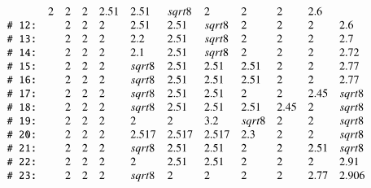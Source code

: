 \begin{tarskidata}
\begin{tarski}
\begin{lemma}
$$\begin{array}{llllllllllll}
   &2 &2 &2 &  2.51& 2.51 &\sqrt8&  2 & 2 & 2 & 2.6\\
%
 \rr{12}&\tuid{MYWEFEM}\tlabel{tarski:E:part4:2}
   &2 &2 &2 &2.51 & 2.51  &\sqrt{8}&   2 & 2 & 2 &  2.6\\
%
 \rr{13}&\tuid{JBUAAWJ} \tlabel{tarski:rem2.7}
     &2 &2 &2 &2.2& 2.51 &\sqrt{8}& 2 & 2 & 2 & 2.7\\
%
 \rr{14}&\tuid{EVWERXQ}\tlabel{tarski:E:part4:3}
   &2 &2 &2 &2.1& 2.51  &\sqrt{8}&   2 & 2 & 2 &  2.72\\
%
 \rr{15}&\tuid{HYEOHXS}\tlabel{tarski:enclosed-v}
   &2 &2 &2 &\sqrt{8}& 2.51 &2.51& 2.51 & 2 & 2 &  2.77\\
%
 \rr{16}&\tuid{MCWJKBZ}\tlabel{tarski:277}
   &2 &2 &2 &\sqrt{8}& 2.51 &2.51& 2.51 & 2 & 2 & 2.77\\
%
 \rr{17}&\tuid{TVORNRR}\tlabel{tarski:245}
   &2 &2 &2 &\sqrt{8}& 2.51 &2.51& 2 & 2 & 2.45 & \sqrt{8}\\
%
 \rr{18}&\tuid{AMVZLGB}\tlabel{tarski:245bis}
   &2 &2 &2 &\sqrt{8}& 2.51 &2.51& 2.51 & 2.45 & 2 & \sqrt{8}\\
%
 \rr{19}&\tuid{UREAOFU}\tlabel{tarski:E:part4:1}
   &2 &2 &2 &  2& 2 &3.2&   \sqrt{8} & 2 & 2 &  \sqrt{8}\\
%
 \rr{20}&\tuid{TADGJXO}\tlabel{tarski:convex-quad}
   &2 &2 &2 &   2.517& 2.517 &2.517&  2.3 & 2 & 2 &  \sqrt8\\
%
 \rr{21}&\tuid{NNPXALF} \tlabel{tarski:pass-anchor}%
     &2&2&2&\sqrt8 &2.51 &2.51 &2 &2 &2.51&\sqrt8\\
%
 \rr{22}&\tuid{GCRJNIH}\tlabel{tarski:E:part4:10}
   &2 &2 &2 &  2& 2.51 &2.51&   2 & 2 & 2 &  2.91\\
%
 \rr{23}&\tuid{DIKGYMO}\tlabel{tarski:dcg-p89}
   &2 &2 &2 &\sqrt8& 2 &2& 2 & 2 & 2.77 &2.906\\
\end{array}$$
\end{lemma}

\begin{proved}
\swallowed\end{proved}
\end{tarski}


 






\begin{tarski}


\end{tarski}
\end{tarskidata}
